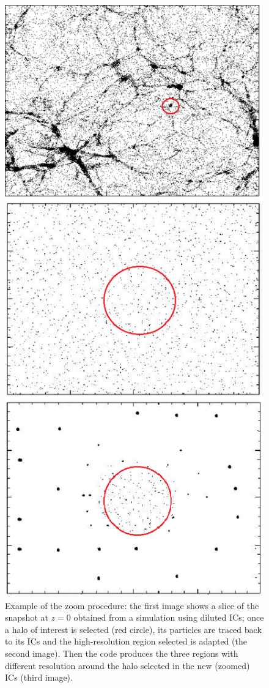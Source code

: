 \documentclass[11pt,a4paper,titlepage]{article}
\begin{document}
\begin{figure}[!p]
\centering
\includegraphics[height=0.4\textheight]{zoom_procedure_vert.png}
\caption{Example of the zoom procedure: the first image shows a slice of the snapshot at $z=0$ obtained from a simulation using diluted ICs; once a halo of interest is selected (red circle), its particles are traced back to its ICs and the high-resolution region selected is adapted (the second image). Then the code produces the three regions with different resolution around the halo selected in the new (zoomed) ICs (third image).}
\label{Zoom_procedure}
\end{figure}
\end{document}
